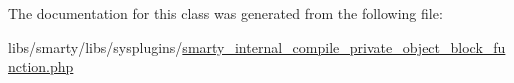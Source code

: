 The documentation for this class was generated from the following file\+:\begin{DoxyCompactItemize}
\item 
libs/smarty/libs/sysplugins/\hyperlink{smarty__internal__compile__private__object__block__function_8php}{smarty\+\_\+internal\+\_\+compile\+\_\+private\+\_\+object\+\_\+block\+\_\+function.\+php}\end{DoxyCompactItemize}

